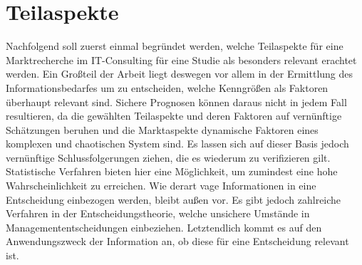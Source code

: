 \section{Teilaspekte}
Nachfolgend soll zuerst einmal begründet werden, welche Teilaspekte für eine Marktrecherche im IT-Consulting für eine Studie als besonders relevant erachtet werden.
Ein Großteil der Arbeit liegt deswegen vor allem in der Ermittlung des Informationsbedarfes um zu entscheiden, welche Kenngrößen als Faktoren überhaupt relevant sind.
Sichere Prognosen können daraus nicht in jedem Fall resultieren, da die gewählten Teilaspekte und deren Faktoren auf vernünftige Schätzungen beruhen und die Marktaspekte dynamische Faktoren eines komplexen und chaotischen System sind. Es lassen sich auf dieser Basis  jedoch vernünftige Schlussfolgerungen ziehen, die es wiederum zu verifizieren gilt. Statistische Verfahren bieten hier eine Möglichkeit, um zumindest eine hohe Wahrscheinlichkeit zu erreichen. 
Wie derart vage Informationen in eine Entscheidung einbezogen werden, bleibt außen vor. Es gibt jedoch zahlreiche Verfahren in der Entscheidungstheorie, welche unsichere Umstände in Managemententscheidungen einbeziehen. Letztendlich kommt es auf den Anwendungszweck der Information an, ob diese für eine Entscheidung relevant ist.
 
